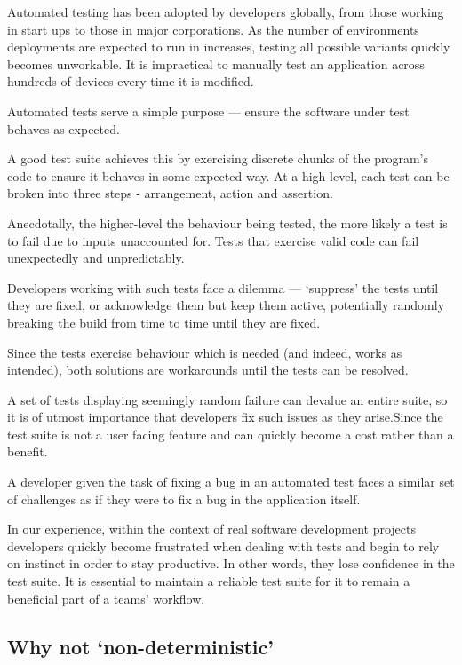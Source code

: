 Automated testing has been adopted by developers globally, from those working in start ups to those in major corporations. As the number of environments deployments are expected to run in increases, testing all possible variants quickly becomes unworkable. It is impractical to manually test an application across hundreds of devices every time it is modified.

Automated tests serve a simple purpose --- ensure the software under test behaves as expected.

A good test suite achieves this by exercising discrete chunks of the program's code to ensure it behaves in some expected way. At a high level, each test can be broken into three steps - arrangement, action and assertion.

Anecdotally, the higher-level the behaviour being tested, the more likely a test is to fail due to inputs unaccounted for. Tests that exercise valid code can fail unexpectedly and unpredictably.

Developers working with such tests face a dilemma --- {\lq}suppress{\rq} the tests until they are fixed, or acknowledge them but keep them active, potentially randomly breaking the build from time to time until they are fixed.

Since the tests exercise behaviour which is needed (and indeed, works as intended), both solutions are workarounds until the tests can be resolved.

A set of tests displaying seemingly random failure can devalue an entire suite, so it is of utmost importance that developers fix such issues as they arise.Since the test suite is not a user facing feature and can quickly become a cost rather than a benefit.

A developer given the task of fixing a bug in an automated test faces a similar set of challenges as if they were to fix a bug in the application itself.

In our experience, within the context of real software development projects developers quickly become frustrated when dealing with \flaky{} tests and begin to rely on instinct in order to stay productive. In other words, they lose confidence in the test suite. It is essential to maintain a reliable test suite for it to remain a beneficial part of a teams' workflow.


\subsection{Why not {\lq}non-deterministic{\rq}}

